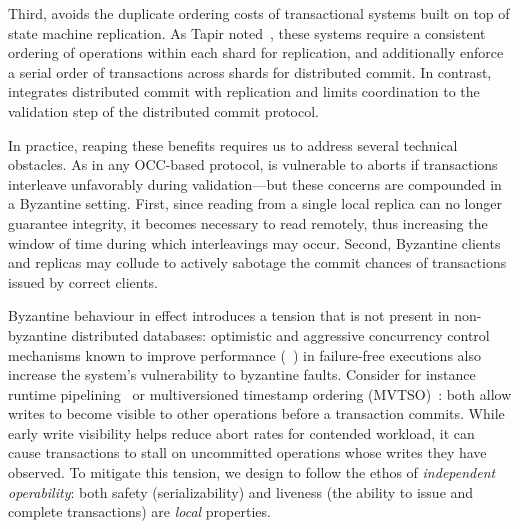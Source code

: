 Third, \sys{} avoids the duplicate ordering costs of transactional systems
built on top of state machine replication. As Tapir noted~\cite{zhang2015tapir,mu2016consolidating},
these systems require a consistent ordering of
operations within each shard for replication, and additionally enforce a serial order of transactions across
shards for distributed commit. In contrast, \sys{} integrates distributed commit with 
replication and
limits coordination to the validation step of the distributed commit
protocol. 

In practice, reaping these benefits requires us to address several
technical obstacles. As in  any OCC-based protocol, \sys
is vulnerable to aborts if transactions interleave unfavorably during
validation---but these concerns are compounded in a Byzantine
setting. First, since reading from a single local replica can no
longer guarantee integrity, it becomes necessary to read remotely,
thus increasing the window of time during which 
interleavings may occur. Second, Byzantine clients and replicas may
collude to actively sabotage the commit chances of transactions issued
by correct clients. 

Byzantine behaviour in effect introduces a tension that is not present in non-byzantine
distributed databases: optimistic and aggressive concurrency control mechanisms known
to improve performance (~\cite{kung1981occ,bernstein1983mcc,reed1983atomic,xie2015callas,zhang2015tapir}) in failure-free executions also increase the system's vulnerability to byzantine faults. Consider for instance runtime pipelining~\cite{xie2015callas,su2017tebaldi} or multiversioned timestamp ordering (MVTSO)~\cite{bernstein1983mcc,reed1983atomic}: both allow writes to become visible to other operations before a transaction commits. While early write visibility helps reduce abort rates for
contended workload, it can cause transactions to stall on uncommitted operations whose writes they have observed. To mitigate this tension, we design \sys{} to follow the ethos of \textit{independent operability}: both safety (serializability) and liveness (the ability to issue and complete transactions) are \textit{local} properties. 

